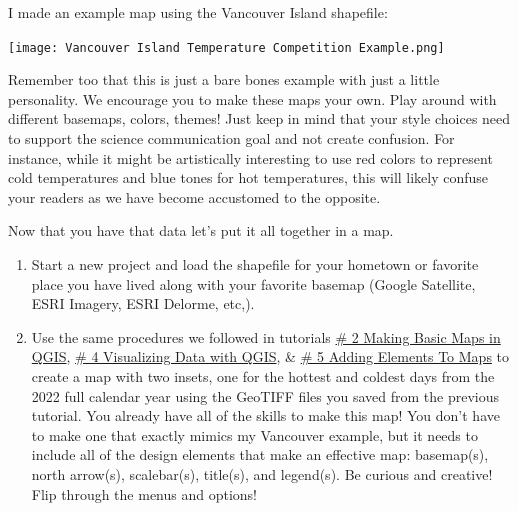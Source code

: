 \documentclass[oneside,a4paper,11pt,explicit]{book}
\begin{document}
I made an example map using the Vancouver Island shapefile:

\centerline{\texttt{[image: Vancouver Island Temperature Competition Example.png]}}

Remember too that this is just a bare bones example with just a little personality. We encourage you to make these maps your own. Play around with different basemaps, colors, themes! Just keep in mind that your style choices need to support the science communication goal and not create confusion. For instance, while it might be artistically interesting to use red colors to represent cold temperatures and blue tones for hot temperatures, this will likely confuse your readers as we have become accustomed to the opposite.  

\begin{tcolorbox}[colback=yellow!5!white,colframe=IceCreamLeaf,title=\textbf{Temperature Competition Next Steps}]
	Now that you have that data let's put it all together in a map.
	\begin{enumerate}
		\item Start a new project and load the shapefile for your hometown or favorite place you have lived along with your favorite basemap (Google Satellite, ESRI Imagery, ESRI Delorme, etc,).
		\item Use the same procedures we followed in tutorials \href{https://jeremydforsythe.github.io/icecream-tutorials/Tutorial2_MakingBasicMapsInQGIS/Tutorial2_MakingBasicMapsInQGIS.pdf}{\# 2 Making Basic Maps in QGIS}, \href{https://jeremydforsythe.github.io/icecream-tutorials/Tutorial4_VisualizingDataWithQGIS/Tutorial4_VisualizingDataWithQGIS.pdf}{\# 4 Visualizing Data with QGIS}, \& \href{https://jeremydforsythe.github.io/icecream-tutorials/Tutorial5_AddingElementsToMaps/Tutorial5_AddingElementsToMaps.pdf}{\# 5 Adding Elements To Maps} to create a map with two insets, one for the hottest and coldest days from the 2022 full calendar year using the GeoTIFF files you saved from the previous tutorial. You already have all of the skills to make this map! You don't have to make one that exactly mimics my Vancouver example, but it needs to include all of the design elements that make an effective map: basemap(s), north arrow(s), scalebar(s), title(s), and legend(s). Be curious and creative! Flip through the menus and options!
	\end{enumerate}
\end{tcolorbox}
	
\end{document}
